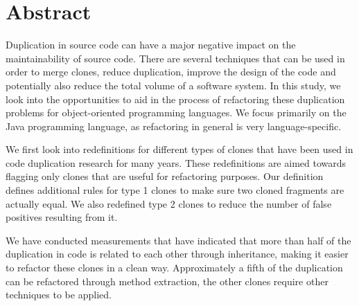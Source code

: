 \chapter*{Abstract}
Duplication in source code can have a major negative impact on the maintainability of source code. There are several techniques that can be used in order to merge clones, reduce duplication, improve the design of the code and potentially also reduce the total volume of a software system. In this study, we look into the opportunities to aid in the process of refactoring these duplication problems for object-oriented programming languages. We focus primarily on the Java programming language, as refactoring in general is very language-specific.

We first look into redefinitions for different types of clones that have been used in code duplication research for many years. These redefinitions are aimed towards flagging only clones that are useful for refactoring purposes. Our definition defines additional rules for type 1 clones to make sure two cloned fragments are actually equal. We also redefined type 2 clones to reduce the number of false positives resulting from it.

We have conducted measurements that have indicated that more than half of the duplication in code is related to each other through inheritance, making it easier to refactor these clones in a clean way. Approximately a fifth of the duplication can be refactored through method extraction, the other clones require other techniques to be applied.
